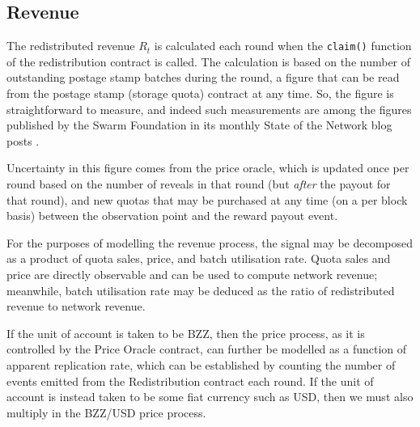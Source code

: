 \subsection{Revenue}
\label{section:revenue}

The redistributed revenue $R_t$ is calculated each round when the \texttt{claim()} function of the redistribution contract is called.
%
The calculation is based on the number of outstanding postage stamp batches during the round, a figure that can be read from the postage stamp (storage quota) contract at any time.
%
So, the figure is straightforward to measure, and indeed such measurements are among the figures published by the Swarm Foundation in its monthly State of the Network blog posts \cite{soft}.

Uncertainty in this figure comes from the price oracle, which is updated once per round based on the number of reveals in that round (but \emph{after} the payout for that round), and new quotas that may be purchased at any time (on a per block basis) between the observation point and the reward payout event.

For the purposes of modelling the revenue process, the signal may be decomposed as a product of quota sales, price, and batch utilisation rate.
%
Quota sales and price are directly observable and can be used to compute network revenue; meanwhile, batch utilisation rate may be deduced as the ratio of redistributed revenue to network revenue.

If the unit of account is taken to be BZZ, then the price process, as it is controlled by the Price Oracle contract, can further be modelled as a function of apparent replication rate, which can be established by counting the number of  events emitted from the Redistribution contract each round.
%
If the unit of account is instead taken to be some fiat currency such as USD, then we must also multiply in the BZZ/USD price process.



